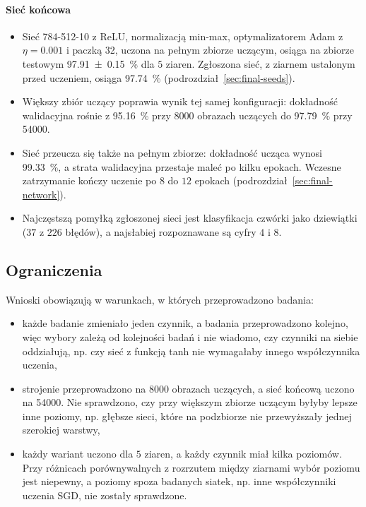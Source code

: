 \paragraph{Sieć końcowa}
\begin{itemize}
    \item Sieć \mbox{784-512-10} z ReLU, normalizacją min-max, optymalizatorem Adam z $\eta = \num{0.001}$ i paczką 32, uczona na pełnym zbiorze uczącym, osiąga na zbiorze testowym \qty{97.91 +- 0.15}{\percent} dla $5$ ziaren. Zgłoszona sieć, z ziarnem ustalonym przed uczeniem, osiąga \qty{97.74}{\percent} (podrozdział~\ref{sec:final-seeds}).
    \item Większy zbiór uczący poprawia wynik tej samej konfiguracji: dokładność walidacyjna rośnie z \qty{95.16}{\percent} przy \num{8000} obrazach uczących do \qty{97.79}{\percent} przy \num{54000}.
    \item Sieć przeucza się także na pełnym zbiorze: dokładność ucząca wynosi \qty{99.33}{\percent}, a strata walidacyjna przestaje maleć po kilku epokach. Wczesne zatrzymanie kończy uczenie po $8$ do $12$ epokach (podrozdział~\ref{sec:final-network}).
    \item Najczęstszą pomyłką zgłoszonej sieci jest klasyfikacja czwórki jako dziewiątki ($37$ z $226$ błędów), a najsłabiej rozpoznawane są cyfry $4$ i $8$.
\end{itemize}

\subsection{Ograniczenia}
\label{sec:conclusions-limitations}

Wnioski obowiązują w warunkach, w których przeprowadzono badania:
\begin{itemize}
    \item każde badanie zmieniało jeden czynnik, a badania przeprowadzono kolejno, więc wybory zależą od kolejności badań i nie wiadomo, czy czynniki na siebie oddziałują, np. czy sieć z funkcją tanh nie wymagałaby innego współczynnika uczenia,
    \item strojenie przeprowadzono na \num{8000} obrazach uczących, a sieć końcową uczono na \num{54000}. Nie sprawdzono, czy przy większym zbiorze uczącym byłyby lepsze inne poziomy, np. głębsze sieci, które na podzbiorze nie przewyższały jednej szerokiej warstwy,
    \item każdy wariant uczono dla $5$ ziaren, a każdy czynnik miał kilka poziomów. Przy różnicach porównywalnych z rozrzutem między ziarnami wybór poziomu jest niepewny, a poziomy spoza badanych siatek, np. inne współczynniki uczenia SGD, nie zostały sprawdzone.
\end{itemize}
